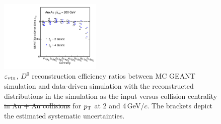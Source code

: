 \documentclass[%
 reprint,	
 amsmath,amssymb,
 aps,
 prc,
]{revtex4-1}
\providecommand{\DIFaddtex}[1]{{\protect\color{blue}\uwave{#1}}} %
\providecommand{\DIFdeltex}[1]{{\protect\color{red}\sout{#1}}}                      %
\providecommand{\DIFdelend}{} %
\providecommand{\DIFaddFL}[1]{\DIFadd{#1}} %
\providecommand{\DIFdelFL}[1]{\DIFdel{#1}} %
\providecommand{\DIFaddbeginFL}{} %
\providecommand{\DIFaddendFL}{} %
\providecommand{\DIFdelbeginFL}{} %
\providecommand{\DIFdelendFL}{} %
\providecommand{\DIFadd}[1]{\texorpdfstring{\DIFaddtex{#1}}{#1}} %
\providecommand{\DIFdel}[1]{\texorpdfstring{\DIFdeltex{#1}}{}} %
\begin{document}
\DIFdelend \begin{figure}
\centering
\includegraphics[width=0.43\textwidth]{fig/Mcd0Eff_20_80_vsCent.pdf}
\caption{$\varepsilon_{\rm vtx}$, $D^0$ reconstruction efficiency ratios between MC GEANT simulation and data-driven simulation with the reconstructed distributions in the simulation as \DIFdelbeginFL \DIFdelFL{the }\DIFdelendFL \DIFaddbeginFL \DIFaddFL{an }\DIFaddendFL input versus collision centrality \DIFdelbeginFL \DIFdelFL{in Au + Au collisions }\DIFdelendFL for \DIFdelbeginFL \DIFdelFL{$p_{\rm T}$ }\DIFdelendFL \DIFaddbeginFL \DIFaddFL{$p_{T}$ }\DIFaddendFL at 2 and 4\,GeV/$c$. The brackets depict the estimated systematic uncertainties.}
\label{fig:Mcd0Eff_20_80_vsCent} 
\end{figure}
\end{document}
